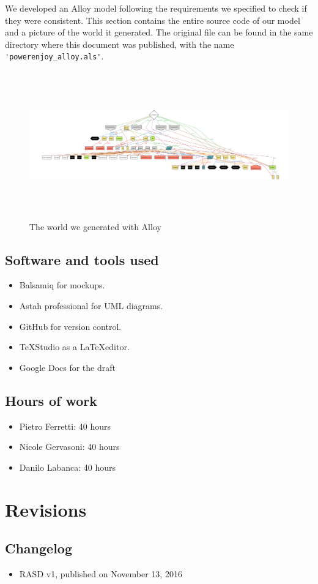 \documentclass[english]{article}
\begin{document}
We developed an Alloy model following the requirements we specified to check if they were consistent. This section contains the entire source code of our model and a picture of the world it generated.
The original file can be found in the same directory where this document was published, with the name \verb|'powerenjoy_alloy.als'|.




\begin{figure}[H]
	\vspace*{-3cm}
	\centering
	\includegraphics[height=180pt, angle=90, origin=c]{World.png}
	\caption{The world we generated with Alloy}
\end{figure}

\subsection{Software and tools used}
\begin{itemize}
  \item{Balsamiq for mockups.}
  \item{Astah professional for UML diagrams.}
  \item{GitHub for version control.}
  \item{\TeX Studio as a \LaTeX editor.}
  \item{Google Docs for the draft}
\end{itemize}

\subsection{Hours of work}
\begin{itemize}
  \item{Pietro Ferretti: 40 hours}
  \item{Nicole Gervasoni: 40 hours}
  \item{Danilo Labanca: 40 hours}
\end{itemize}
\newpage{}

\section{Revisions}

\subsection{Changelog}
\begin{itemize}
  \item{RASD v1, published on November 13, 2016}
\end{itemize}
\end{document}
